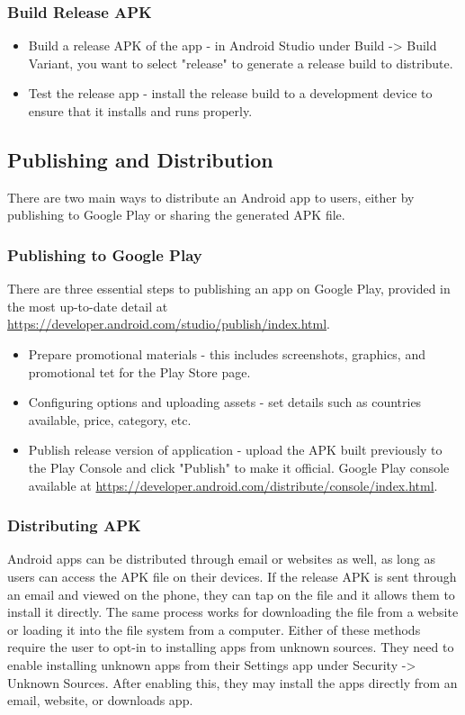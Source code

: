 \subsubsection{Build Release APK}
\begin{itemize}
    \item Build a release APK of the app - in Android Studio under Build -> Build Variant, you want to select "release" to generate a release build to distribute.
    \item Test the release app - install the release build to a development device to ensure that it installs and runs properly.
\end{itemize} 

\subsection{Publishing and Distribution}
There are two main ways to distribute an Android app to users, either by publishing to Google Play or sharing the generated APK file.
\subsubsection{Publishing to Google Play}
There are three essential steps to publishing an app on Google Play, provided in the most up-to-date detail at \url{https://developer.android.com/studio/publish/index.html}. 
\begin{itemize}
    \item Prepare promotional materials - this includes screenshots, graphics, and promotional tet for the Play Store page.
    \item Configuring options and uploading assets - set details such as countries available, price, category, etc.
    \item Publish release version of application - upload the APK built previously to the Play Console and click "Publish" to make it official. Google Play console available at \url{https://developer.android.com/distribute/console/index.html}.
\end{itemize}
\subsubsection{Distributing APK}
Android apps can be distributed through email or websites as well, as long as users can access the APK file on their devices. If the release APK is sent through an email and viewed on the phone, they can tap on the file and it allows them to install it directly. The same process works for downloading the file from a website or loading it into the file system from a computer. Either of these methods require the user to opt-in to installing apps from unknown sources. They need to enable installing unknown apps from their Settings app under Security -> Unknown Sources. After enabling this, they may install the apps directly from an email, website, or downloads app.
